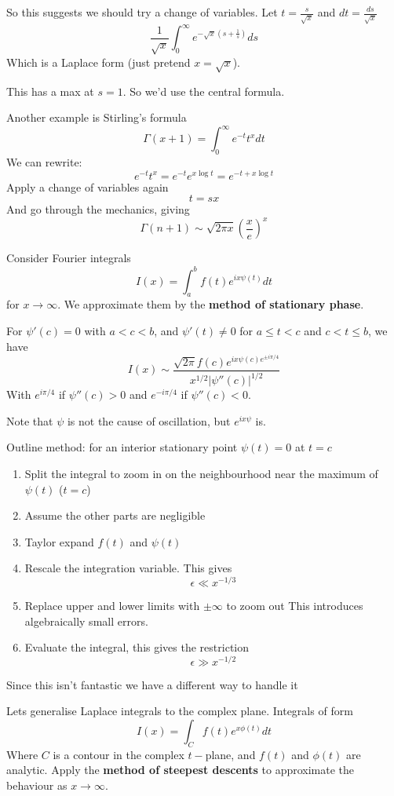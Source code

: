 \documentclass{X:/Documents/Coding/Latex/myassignment}
\begin{document}
So this suggests we should try a change of variables. Let $t=\frac{s}{\sqrt{x}}$ and $dt= \frac{ds}{\sqrt{x}}$
\[\frac{1}{\sqrt{x}} \int_0^\infty e^{-\sqrt{x} (s + \frac1s)} ds\]
Which is a Laplace form (just pretend $x = \sqrt{x}$).

This has a max at $s=1$. So we'd use the central formula.


Another example is Stirling's formula
\[\Gamma(x+1) = \int_0^\infty e^{-t} t^x dt\]
We can rewrite:
\[e^{-t} t^x = e^{-t}e^{x\log t} = e^{-t+x\log t}\]
Apply a change of variables again
\[t = sx\]
And go through the mechanics, giving
\[\Gamma(n+1) \sim \sqrt{2\pi x} \left(\frac{x}{e}\right)^x\]



Consider Fourier integrals
\[I(x) = \int_a^b f(t) e^{ix\psi (t)} dt\]
for $x\to\infty$. We approximate them by the \textbf{method of stationary phase}. 

For $\psi'(c)=0$ with $a<c<b$, and $\psi'(t) \neq 0$ for $a\leq t < c$ and $c < t\leq b$, we have
\[I(x) \sim \frac{\sqrt{2\pi} f(c) e^{ix\psi(c) e^{\pm i \pi/4}}}{x^{1/2} |\psi''(c)|^{1/2}}\]
With $e^{i\pi/4}$ if $\psi''(c) > 0$ and $e^{-i\pi/4}$ if $\psi''(c) < 0$.


Note that $\psi$ is not the cause of oscillation, but $e^{ix \psi}$ is.

Outline method: for an interior stationary point $\psi(t) = 0$ at $t=c$
\begin{enumerate}
    \item Split the integral to zoom in on the neighbourhood near the maximum of $\psi(t)$ ($t=c$)
    \item Assume the other parts are negligible
    \item Taylor expand $f(t)$ and $\psi(t)$
    \item Rescale the integration variable. This gives
    \[\epsilon \ll x^{-1/3}\]
    \item Replace upper and lower limits with $\pm\infty$ to zoom out
    This introduces algebraically small errors.
    \item Evaluate the integral, this gives the restriction
    \[\epsilon \gg x^{-1/2}\]
\end{enumerate}
Since this isn't fantastic we have a different way to handle it




Lets generalise Laplace integrals to the complex plane. Integrals of form
\[I(x) = \int_C f(t) e^{x\phi(t)} dt\]
Where $C$ is a contour in the complex $t-$plane, and $f(t)$ and $\phi(t)$ are analytic.
Apply the \textbf{method of steepest descents} to approximate the behaviour as $x\to\infty$.
\end{document}
